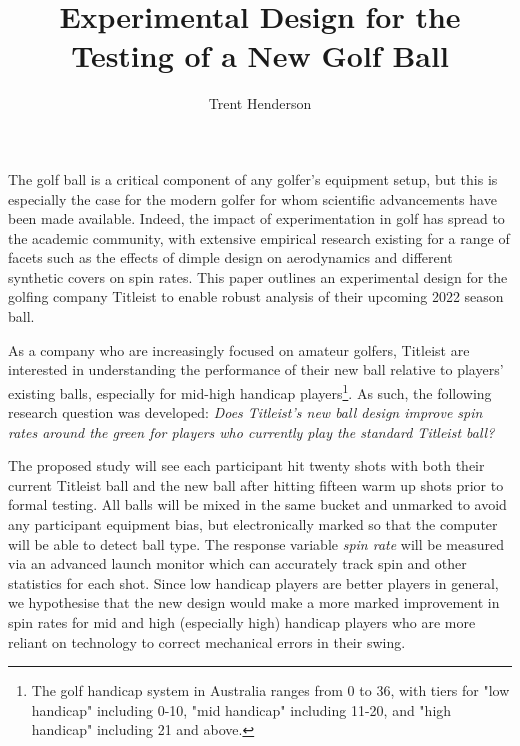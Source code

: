 \documentclass{article}
\begin{document}
\title{\vspace{-4cm}Experimental Design for the Testing of a New Golf Ball}
\author{Trent Henderson}
\date{}

\maketitle

The golf ball is a critical component of any golfer's equipment setup, but this is especially the case for the modern golfer for whom scientific advancements have been made available. 
Indeed, the impact of experimentation in golf has spread to the academic community, with extensive empirical research existing for a range of facets such as the effects of dimple design on aerodynamics and different synthetic covers on spin rates. 
This paper outlines an experimental design for the golfing company Titleist to enable robust analysis of their upcoming 2022 season ball.

As a company who are increasingly focused on amateur golfers, Titleist are interested in understanding the performance of their new ball relative to players' existing balls, especially for mid-high handicap players\footnote{The golf handicap system in Australia ranges from 0 to 36, with tiers for "low handicap" including 0-10, "mid handicap" including 11-20, and "high handicap" including 21 and above.}. 
As such, the following research question was developed: \textit{Does Titleist's new ball design improve spin rates around the green for players who currently play the standard Titleist ball?} 

The proposed study will see each participant hit twenty shots with both their current Titleist ball and the new ball after hitting fifteen warm up shots prior to formal testing. 
All balls will be mixed in the same bucket and unmarked to avoid any participant equipment bias, but electronically marked so that the computer will be able to detect ball type.
The response variable \textit{spin rate} will be measured via an advanced launch monitor which can accurately track spin and other statistics for each shot.
Since low handicap players are better players in general, we hypothesise that the new design would make a more marked improvement in spin rates for mid and high (especially high) handicap players who are more reliant on technology to correct mechanical errors in their swing.
\end{document}
